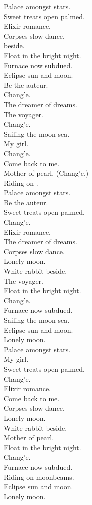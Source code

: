 Palace amongst stars. \\
Sweet treats open palmed. \\
Elixir romance. \\
Corpses slow dance. \\
 beside. \\
Float in the bright night. \\
Furnace now subdued. \\
Eclipse sun and moon. \\

Be the auteur. \\
Chang'e. \\
The dreamer of dreams. \\
The voyager. \\
Chang'e. \\
Sailing the moon-sea. \\
My girl. \\
Chang'e. \\
Come back to me. \\
Mother of pearl. (Chang'e.) \\
Riding on . \\

Palace amongst stars. \\
Be the auteur. \\
Sweet treats open palmed. \\
Chang'e. \\
Elixir romance. \\
The dreamer of dreams. \\
Corpses slow dance. \\
Lonely moon. \\
White rabbit beside. \\
The voyager. \\
Float in the bright night. \\
Chang'e. \\
Furnace now subdued. \\
Sailing the moon-sea. \\
Eclipse sun and moon. \\
Lonely moon. \\

Palace amongst stars. \\
My girl. \\
Sweet treats open palmed. \\
Chang'e. \\
Elixir romance. \\
Come back to me. \\
Corpses slow dance. \\
Lonely moon. \\
White rabbit beside. \\
Mother of pearl. \\
Float in the bright night. \\
Chang'e. \\
Furnace now subdued. \\
Riding on moonbeams. \\
Eclipse sun and moon. \\
Lonely moon. \\

